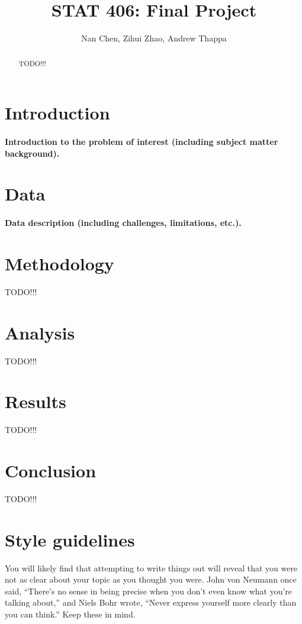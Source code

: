 \documentclass[12pt]{article}
\title{STAT 406: Final Project}
\author{Nan Chen, Zihui Zhao, Andrew Thappa}
\begin{document}
\maketitle

\begin{abstract}
TODO!!!
\end{abstract}

\newpage
\tableofcontents




\newpage
\section{Introduction}
\paragraph{ Introduction  to  the  problem  of  interest  (including  subject  matter  background).}

\section{Data}
\paragraph{Data description (including challenges, limitations, etc.).}

\section{Methodology}
TODO!!!
\section{Analysis}
TODO!!!
\section{Results}
TODO!!!
\section{Conclusion}
TODO!!!

\newpage
\section{Style guidelines}

You will likely find that attempting to write things out will reveal that you
were not as clear about your topic as you thought you were. John von
Neumann once said, ``There's no sense in being precise when you don't even know
what you're talking about,'' and Niels Bohr wrote, ``Never express yourself more
clearly than you can think.'' Keep these in mind.
\end{document}
